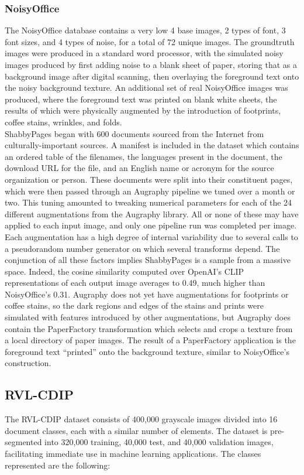 \documentclass[runningheads]{llncs}
\begin{document}
\subsubsection{NoisyOffice}
The NoisyOffice database \cite{ref_NoisyOffice} contains a very low 4 base images, 2 types of font, 3 font sizes, and 4 types of noise, for a total of 72 unique images. The groundtruth images were produced in a standard word processor, with the simulated noisy images produced by first adding noise to a blank sheet of paper, storing that as a background image after digital scanning, then overlaying the foreground text onto the noisy background texture. An additional set of real NoisyOffice images was produced, where the foreground text was printed on blank white sheets, the results of which were physically augmented by the introduction of footprints, coffee stains, wrinkles, and folds.\\

ShabbyPages began with 600 documents sourced from the Internet from culturally-important sources. A manifest is included in the dataset which contains an ordered table of the filenames, the languages present in the document, the download URL for the file, and an English name or acronym for the source organization or person. These documents were split into their constituent pages, which were then passed through an Augraphy pipeline we tuned over a month or two. This tuning amounted to tweaking numerical parameters for each of the 24 different augmentations from the Augraphy library. All or none of these may have applied to each input image, and only one pipeline run was completed per image. Each augmentation has a high degree of internal variability due to several calls to a pseudorandom number generator on which several transforms depend. The conjunction of all these factors implies ShabbyPages is a sample from a massive space. Indeed, the cosine similarity computed over OpenAI's CLIP representations of each output image averages to 0.49, much higher than NoisyOffice's 0.31. Augraphy does not yet have augmentations for footprints or coffee stains, so the dark regions and edges of the stains and prints were simulated with features introduced by other augmentations, but Augraphy does contain the PaperFactory transformation which selects and crops a texture from a local directory of paper images. The result of a PaperFactory application is the foreground text ``printed'' onto the background texture, similar to NoisyOffice's construction.

\subsection{RVL-CDIP}
The RVL-CDIP dataset \cite{ref_RVL-CDIP} consists of 400,000 grayscale images divided into 16 document classes, each with a similar number of elements. The dataset is pre-segmented into 320,000 training, 40,000 test, and 40,000 validation images, facilitating immediate use in machine learning applications. The classes represented are the following:
\end{document}
